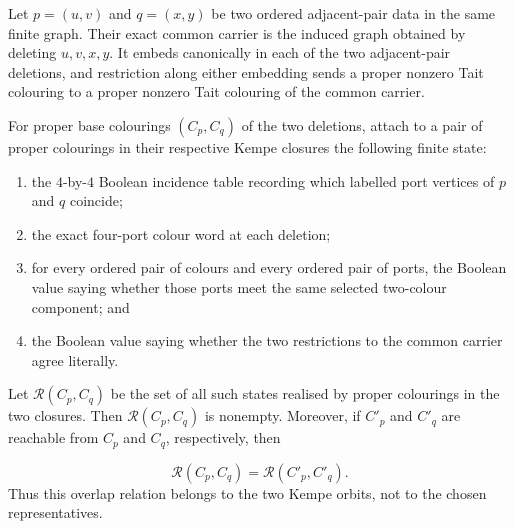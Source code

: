 \begin{lemma}
\label{lem:adjacent-pair-overlap-kempe-state}
Let \(p=(u,v)\) and \(q=(x,y)\) be two ordered adjacent-pair data in the
same finite graph.  Their exact common carrier is the induced graph obtained
by deleting \(u,v,x,y\).  It embeds canonically in each of the two
adjacent-pair deletions, and restriction along either embedding sends a
proper nonzero Tait colouring to a proper nonzero Tait colouring of the
common carrier.

For proper base colourings \((C_p,C_q)\) of the two deletions, attach to a pair
of proper colourings in their respective Kempe closures the following finite
state:

\begin{enumerate}
\item the \(4\)-by-\(4\) Boolean incidence table recording which labelled
  port vertices of \(p\) and \(q\) coincide;
\item the exact four-port colour word at each deletion;
\item for every ordered pair of colours and every ordered pair of ports, the
  Boolean value saying whether those ports meet the same selected
  two-colour component; and
\item the Boolean value saying whether the two restrictions to the common
  carrier agree literally.
\end{enumerate}

Let \(\mathcal R(C_p,C_q)\) be the set of all such states realised by proper
colourings in the two closures.  Then \(\mathcal R(C_p,C_q)\) is nonempty.
Moreover, if \(C'_p\) and \(C'_q\) are reachable from \(C_p\) and \(C_q\),
respectively, then

\[
        \mathcal R(C_p,C_q)=\mathcal R(C'_p,C'_q).
\]
Thus this overlap relation belongs to the two Kempe orbits, not to the
chosen representatives.
\end{lemma}

